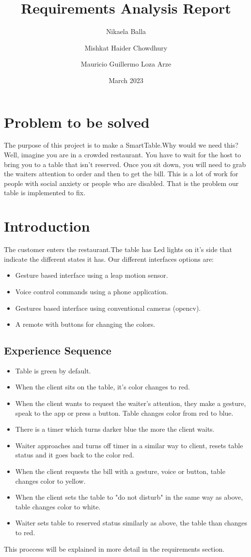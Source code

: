 \documentclass{article}
\title{Requirements Analysis Report}
\author{Nikaela Balla
\and Mishkat Haider Chowdhury
\and Mauricio Guillermo Loza Arze}
\date{March 2023}
\begin{document}
\maketitle

\section{ Problem to be solved}
\label{sec:problem}
The purpose of this project is to make a SmartTable.Why would we need this? 
Well, imagine you are in a crowded restaurant. You have to wait for the host to bring you to a table that isn't reserved. Once you sit down,
you will need to grab the waiters attention to order and then to get the bill. This is a lot of work for people with social anxiety or people 
who are disabled. That is the problem our table is implemented to fix.
\section{ Introduction}
The customer enters the restaurant.The table has Led lights on it's side that indicate the different states it has. Our different interfaces 
options are: \begin{itemize}
    \item Gesture based interface using a leap motion sensor.
    \item  Voice control commands using a phone application.
    \item  Gestures based interface using conventional cameras (opencv).
    \item A remote with buttons for changing the colors.
\end{itemize}
\subsection{Experience Sequence }
\begin{itemize}
    \item Table is green by default.
    \item  When the client sits on the table, it's color changes to red.
    \item When the client wants to request the waiter's attention, they make a gesture, speak to the app or press a button. 
    Table changes color from  red to blue.
    \item  There is  a timer which turns darker blue the more the client waits.
    \item Waiter approaches and turns off timer in a similar way to client, resets table status and it goes back to the color red.
    \item When the client requests the bill with a gesture, voice or button, table changes color to yellow.
    \item When the client sets the table to "do not disturb" in the same way as above, table changes color to white.
    \item Waiter sets table to reserved status similarly as above, the table than changes to red.
\end{itemize}
This proccess will be explained in more detail in the requirements section.
\end{document}
